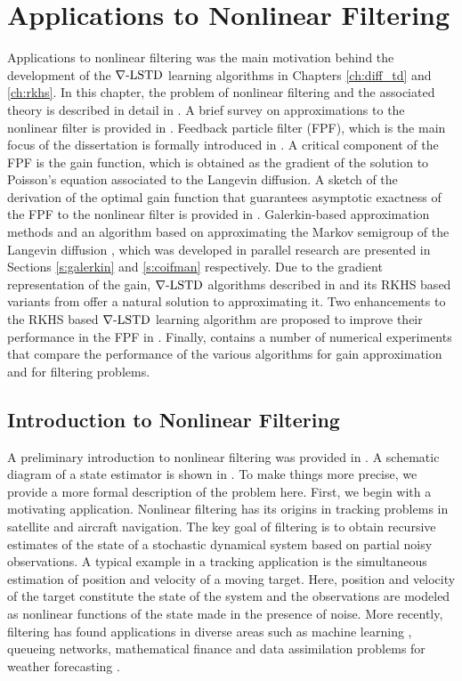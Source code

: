 \chapter{Applications to Nonlinear Filtering} 
\label{ch:filtering}
Applications to nonlinear filtering was the main motivation behind the development of the $\nabla\text{-LSTD}$ learning algorithms in Chapters \ref{ch:diff_td} and \ref{ch:rkhs}. In this chapter, the problem of nonlinear filtering and the associated theory is described in detail in . A brief survey on approximations to the nonlinear filter is provided in . Feedback particle filter (FPF), which is the main focus of the dissertation is formally introduced in . A critical component of the FPF is the gain function, which is obtained as the gradient of the solution to Poisson's equation associated to the Langevin diffusion. A sketch of the derivation of the optimal gain function that guarantees asymptotic exactness of the FPF to the nonlinear filter is provided in . Galerkin-based approximation methods and an algorithm based on approximating the Markov semigroup of the Langevin diffusion \cite{tagmeh16a}, which was developed in parallel research are presented in Sections \ref{s:galerkin} and \ref{s:coifman} respectively. Due to the gradient representation of the gain, $\nabla\text{-LSTD}$ algorithms described in  and its RKHS based variants from  offer a natural solution to approximating it. Two enhancements to the RKHS based $\nabla\text{-LSTD}$ learning algorithm are proposed to improve their performance in the FPF in . Finally,  contains a number of numerical experiments that compare the performance of the various algorithms for gain approximation and for filtering problems.  

\section{Introduction to Nonlinear Filtering} 
\label{s:nl_filtering_intro}
A preliminary introduction to nonlinear filtering was provided in . A schematic diagram of a state estimator is shown in . To make things more precise, we provide a more formal description of the problem here. First, we begin with a motivating application. Nonlinear filtering has its origins in tracking problems in satellite and aircraft navigation. The key goal of filtering is to obtain recursive estimates of the state of a stochastic dynamical system based on partial noisy observations. A typical example in a tracking application is the simultaneous estimation of position and velocity of a moving target. Here, position and velocity of the target constitute the state of the system and the observations are modeled as nonlinear functions of the state made in the presence of noise. More recently, filtering has found applications in diverse areas such as machine learning \cite{bishop06}, queueing networks, mathematical finance \cite{brihan08} and data assimilation problems for weather forecasting \cite{eve94}. 

